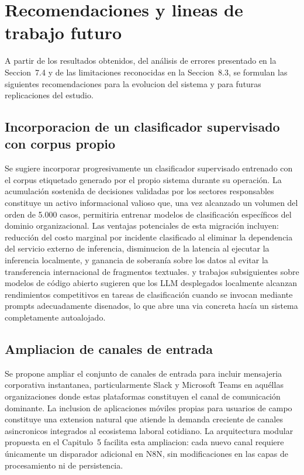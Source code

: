 \section{Recomendaciones y lineas de trabajo futuro}

A partir de los resultados obtenidos, del análisis de errores presentado en la Seccion~7.4 y de las limitaciones reconocidas en la Seccion~8.3, se formulan las siguientes recomendaciones para la evolucion del sistema y para futuras replicaciones del estudio.

\subsection{Incorporacion de un clasificador supervisado con corpus propio}

Se sugiere incorporar progresivamente un clasificador supervisado entrenado con el corpus etiquetado generado por el propio sistema durante su operación. La acumulación sostenida de decisiones validadas por los sectores responsables constituye un activo informacional valioso que, una vez alcanzado un volumen del orden de 5.000 casos, permitiria entrenar modelos de clasificación específicos del dominio organizacional. Las ventajas potenciales de esta migración incluyen: reducción del costo marginal por incidente clasificado al eliminar la dependencia del servicio externo de inferencia, disminucion de la latencia al ejecutar la inferencia localmente, y ganancia de soberanía sobre los datos al evitar la transferencia internacional de fragmentos textuales. \textcite{Touvron2023_llama2} y trabajos subsiguientes sobre modelos de código abierto sugieren que los LLM desplegados localmente alcanzan rendimientos competitivos en tareas de clasificación cuando se invocan mediante prompts adecuadamente disenados, lo que abre una via concreta hacía un sistema completamente autoalojado.

\subsection{Ampliacion de canales de entrada}

Se propone ampliar el conjunto de canales de entrada para incluir mensajeria corporativa instantanea, particularmente Slack y Microsoft Teams en aquéllas organizaciones donde estas plataformas constituyen el canal de comunicación dominante. La inclusion de aplicaciones móviles propias para usuarios de campo constituye una extension natural que atiende la demanda creciente de canales asincronicos integrados al ecosistema laboral cotidiano. La arquitectura modular propuesta en el Capitulo~5 facilita esta ampliacion: cada nuevo canal requiere únicamente un disparador adicional en N8N, sin modificaciones en las capas de procesamiento ni de persistencia.

